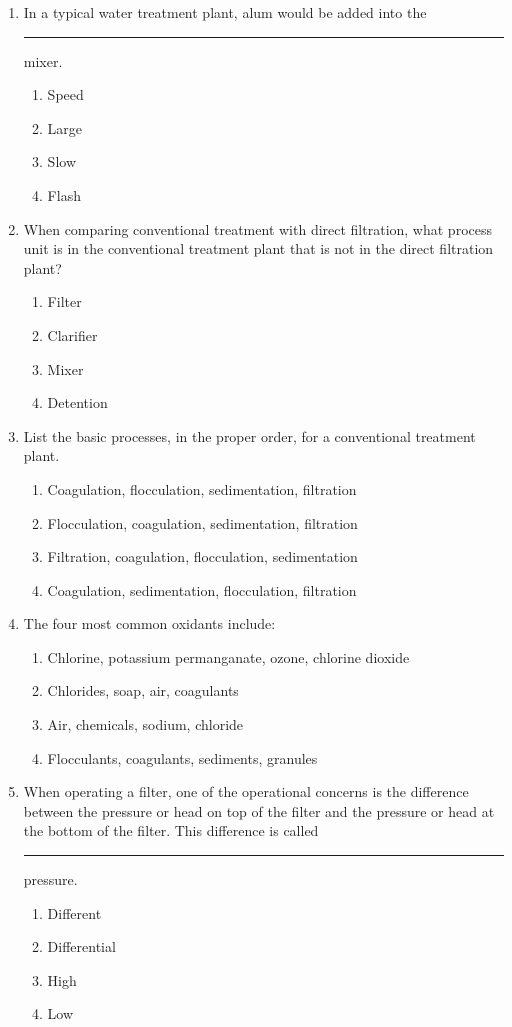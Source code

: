 \begin{enumerate}
\item In a typical water treatment plant, alum would be added into the \rule{2cm}{0.3pt} mixer.
\begin{enumerate}
\item Speed
\item Large
\item Slow
\item Flash
\end{enumerate}

\item When comparing conventional treatment with direct filtration, what process unit is in the conventional treatment plant that is not in the direct filtration plant?
\begin{enumerate}
\item Filter
\item Clarifier
\item Mixer
\item Detention
\end{enumerate}

\item List the basic processes, in the proper order, for a conventional treatment plant.
\begin{enumerate}
\item Coagulation, flocculation, sedimentation, filtration
\item Flocculation, coagulation, sedimentation, filtration
\item Filtration, coagulation, flocculation, sedimentation
\item Coagulation, sedimentation, flocculation, filtration
\end{enumerate}

\item The four most common oxidants include:
\begin{enumerate}
\item Chlorine, potassium permanganate, ozone, chlorine dioxide
\item Chlorides, soap, air, coagulants
\item Air, chemicals, sodium, chloride
\item Flocculants, coagulants, sediments, granules
\end{enumerate}

\item  When operating a filter, one of the operational concerns is the difference between the pressure or head on top of the filter and the pressure or head at the bottom of the filter. This difference is called \rule{2cm}{0.3pt} pressure.
\begin{enumerate}
\item Different
\item Differential
\item High
\item Low
\end{enumerate}


\end{enumerate}
